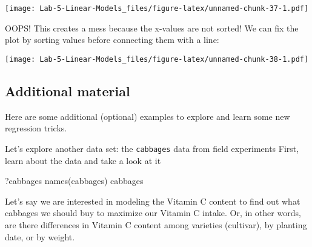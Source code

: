 \documentclass[
]{article}
\newenvironment{Shaded}{\begin{snugshade}}{\end{snugshade}}
\newcommand{\AttributeTok}[1]{\textcolor[rgb]{0.77,0.63,0.00}{#1}}
\newcommand{\CommentTok}[1]{\textcolor[rgb]{0.56,0.35,0.01}{\textit{#1}}}
\newcommand{\DecValTok}[1]{\textcolor[rgb]{0.00,0.00,0.81}{#1}}
\newcommand{\FunctionTok}[1]{\textcolor[rgb]{0.00,0.00,0.00}{#1}}
\newcommand{\NormalTok}[1]{#1}
\newcommand{\OtherTok}[1]{\textcolor[rgb]{0.56,0.35,0.01}{#1}}
\newcommand{\SpecialCharTok}[1]{\textcolor[rgb]{0.00,0.00,0.00}{#1}}
\begin{document}
\texttt{[image: Lab-5-Linear-Models\_files/figure-latex/unnamed-chunk-37-1.pdf]}

OOPS! This creates a mess because the x-values are not sorted! We can
fix the plot by sorting values before connecting them with a line:

\begin{Shaded}
\end{Shaded}

\texttt{[image: Lab-5-Linear-Models\_files/figure-latex/unnamed-chunk-38-1.pdf]}

\pagebreak

\hypertarget{additional-material}{%
\subsection{Additional material}\label{additional-material}}

Here are some additional (optional) examples to explore and learn some
new regression tricks.

Let's explore another data set: the \texttt{cabbages} data from field
experiments First, learn about the data and take a look at it

\begin{Shaded}
\begin{Highlighting}[]
\NormalTok{?cabbages}
\FunctionTok{names}\NormalTok{(cabbages)}
\NormalTok{cabbages}
\end{Highlighting}
\end{Shaded}

Let's say we are interested in modeling the Vitamin C content to find
out what cabbages we should buy to maximize our Vitamin C intake. Or, in
other words, are there differences in Vitamin C content among varieties
(cultivar), by planting date, or by weight.
\end{document}
